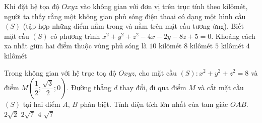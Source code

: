 \begin{ex}%
	Khi đặt hệ tọa độ $Oxyz$ vào không gian với đơn vị trên trục tính  theo kilômét, người ta thấy rằng một không gian phủ sóng điện thoại có dạng một hình cầu $(S)$ (tập hợp những điểm nằm trong và nằm trên mặt cầu tương ứng). Biết mặt cầu $(S)$ có phương trình $x^2+y^2+z^2-4x-2y-8z+5=0$. Khoảng cách xa nhất giữa hai điểm thuộc vùng phủ sóng là
	 \choice
		 {$10$ kilômét}
		{\True  $8$ kilômét}
		{$5$  kilômét}
		{$4$  kilômét}
\end{ex}

\begin{ex}%
	Trong không gian với hệ trục toạ độ $Oxyz$, cho mặt cầu $(S)\colon x^2+y^2+z^2=8$ và điểm $M\left(\dfrac{1}{2}; \dfrac{\sqrt{3}}{2}; 0\right)$. Đường thẳng $d$ thay  đổi, đi qua điểm $M$ và cắt mặt cầu $(S)$ tại hai điểm $A$, $B$ phân biệt. Tính diện tích lớn nhất của tam giác $OAB$.
	 \choice
		{$2\sqrt{2}$} 
		{$2\sqrt{7}$} 
		 {$4$}
		{\True $\sqrt{7}$} 
\end{ex}



